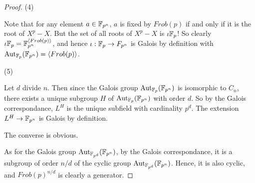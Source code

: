 \documentclass[../book.tex]{subfiles}
\begin{document}
\begin{proof}
    (4)
        
        Note that for any element $a \in \mathbb{F}_{p^n}$,
        $a$ is fixed by $Frob(p)$ if and only if it is the root of $X^p - X$. 
        But the set of all roots of $X^p - X$ is $\iota \mathbb{F}_p$!
        So clearly $\iota \mathbb{F}_p = \mathbb{F}_{p^n}^{\langle Frob(p)\rangle}$,
        and hence $\iota : \mathbb{F}_p \to F_{p^n}$ is Galois by definition 
        with $\text{Aut}_{\mathbb{F}_p}(\mathbb{F}_{p^n}) = \langle Frob(p)\rangle$.
        
    (5)
        
        Let $d$ divide $n$.
        Then since the Galois group $\text{Aut}_{\mathbb{F}_p}(\mathbb{F}_{p^n})$ is isomorphic to $C_n$,
        there exists a unique subgroup $H$ of $\text{Aut}_{\mathbb{F}_p}(\mathbb{F}_{p^n})$ with order $d$. 
        So by the Galois correspondance, 
        $L^H$ is the unique subfield with cardinality $p^d$.
        The extension $L^H \to \mathbb{F}_{p^n}$ is Galois by definition.
        
        The converse is obvious. 
        
        As for the Galois group $\text{Aut}_{\mathbb{F}_{p^d}}(\mathbb{F}_{p^n})$,
        by the Galois correspondance, 
        it is a subgroup of order $n/d$ 
        of the cyclic group $\text{Aut}_{\mathbb{F}_{p^d}}(\mathbb{F}_{p^n})$.
        Hence, it is also cyclic, and $Frob(p)^{n/d}$ is clearly a generator.
        
\end{proof}
%
\end{document}
